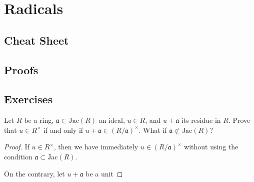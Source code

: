 \chapter{Radicals}

\section{Cheat Sheet}

\section{Proofs}

\section{Exercises}

\begin{exr}
    Let \(R\) be a ring, \(\mathfrak{a} \subset \mathrm{Jac}(R)\) an ideal, \(u \in R\), and \(u + \mathfrak{a}\) its residue in \(R\). Prove that \(u \in R^\times\) if and only if \(u + \mathfrak{a} \in (R / \mathfrak{a})^\times\). What if \(\mathfrak{a} \not\subset \mathrm{Jac}(R)\)?
\end{exr}
\begin{proof}
    If \(u \in R^\times\), then we have immediately \(u \in (R/\mathfrak{a})^\times\) without using the condition \(\mathfrak{a} \subset \mathrm{Jac}(R)\).

    On the contrary, let \(u + \mathfrak{a}\) be a unit
\end{proof}